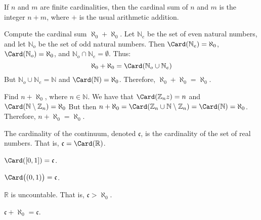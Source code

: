     \begin{theorem}
        If $n$ and $m$ are finite cardinalities, then the cardinal sum
        of $n$ and $m$ is the integer $n+m$, where $+$ is the usual
        arithmetic addition.
    \end{theorem}
    \begin{example}
        Compute the cardinal sum $\aleph_{0}+\aleph_{0}$. Let
        $\mathbb{N}_{e}$ be the set of even natural numbers, and let
        $\mathbb{N}_{o}$ be the set of odd natural numbers. Then
        $\Card(\mathbb{N}_{e})=\aleph_{0}$,
        $\Card(\mathbb{N}_{o})=\aleph_{0}$, and
        ${\mathbb{N}_{o}}\cap{\mathbb{N}_{e}}=\emptyset$.
        Thus:
        \begin{equation}
            \aleph_{0}+\aleph_{0}
            =\Card({\mathbb{N}_{o}}\cup{\mathbb{N}_{e}})
        \end{equation}
        But ${\mathbb{N}_{o}}\cup{\mathbb{N}_{e}}=\mathbb{N}$ and
        $\Card(\mathbb{N})=\aleph_{0}$. Therefore,
        $\aleph_{0}+\aleph_{0}=\aleph_{0}$.
    \end{example}
    \begin{example}
        Find $n+\aleph_{0}$, where $n\in\mathbb{N}$.
        We have that
        $\Card(\mathbb{Z}_{n}z)=n$ and
        $\Card(\mathbb{N}\setminus\mathbb{Z}_{n})%
         =\aleph_{0}$
        But then
        $n+\aleph_{0}=%
         \Card(\mathbb{Z}_{n}\cup%
         \mathbb{N}\setminus\mathbb{Z}_{n})%
         =\Card(\mathbb{N})=\aleph_{0}$.
        Therefore, $n+\aleph_{0}=\aleph_{0}$.
    \end{example}
    \begin{definition}
        The cardinality of the continuum,
        denoted $\mathfrak{c}$, is the
        cardinality of the set of real numbers.
        That is, $\mathfrak{c}=\Card(\mathbb{R})$.
    \end{definition}
    \begin{theorem}
        $\Card([0,1])=\mathfrak{c}$.
    \end{theorem}
    \begin{theorem}
        $\Card\big((0,1)\big)=\mathfrak{c}$.
    \end{theorem}
    \begin{theorem}
        $\mathbb{R}$ is uncountable. That is,
        $\mathfrak{c}>\aleph_{0}$.
    \end{theorem}
    \begin{theorem}
        $\mathfrak{c}+\aleph_{0}=\mathfrak{c}$.
    \end{theorem}
